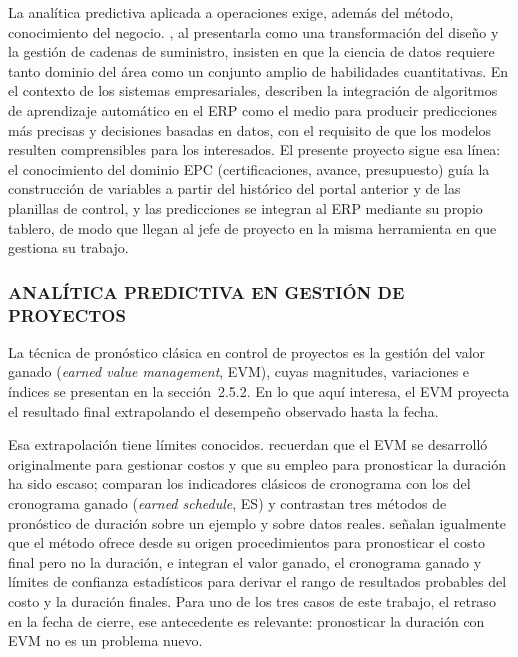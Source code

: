 La analítica predictiva aplicada a operaciones exige, además del método, conocimiento del negocio. \textcite{Waller2013}, al presentarla como una transformación del diseño y la gestión de cadenas de suministro, insisten en que la ciencia de datos requiere tanto dominio del área como un conjunto amplio de habilidades cuantitativas. En el contexto de los sistemas empresariales, \textcite{MLdrivenERP2023} describen la integración de algoritmos de aprendizaje automático en el ERP como el medio para producir predicciones más precisas y decisiones basadas en datos, con el requisito de que los modelos resulten comprensibles para los interesados. El presente proyecto sigue esa línea: el conocimiento del dominio EPC (certificaciones, avance, presupuesto) guía la construcción de variables a partir del histórico del portal anterior y de las planillas de control, y las predicciones se integran al ERP mediante su propio tablero, de modo que llegan al jefe de proyecto en la misma herramienta en que gestiona su trabajo.

\subsubsection{ANALÍTICA PREDICTIVA EN GESTIÓN DE PROYECTOS}

La técnica de pronóstico clásica en control de proyectos es la gestión del valor ganado (\textit{earned value management}, EVM), cuyas magnitudes, variaciones e índices se presentan en la sección~2.5.2. En lo que aquí interesa, el EVM proyecta el resultado final extrapolando el desempeño observado hasta la fecha.

Esa extrapolación tiene límites conocidos. \textcite{Vandevoorde2006} recuerdan que el EVM se desarrolló originalmente para gestionar costos y que su empleo para pronosticar la duración ha sido escaso; comparan los indicadores clásicos de cronograma con los del cronograma ganado (\textit{earned schedule}, ES) y contrastan tres métodos de pronóstico de duración sobre un ejemplo y sobre datos reales. \textcite{Lipke2009} señalan igualmente que el método ofrece desde su origen procedimientos para pronosticar el costo final pero no la duración, e integran el valor ganado, el cronograma ganado y límites de confianza estadísticos para derivar el rango de resultados probables del costo y la duración finales. Para uno de los tres casos de este trabajo, el retraso en la fecha de cierre, ese antecedente es relevante: pronosticar la duración con EVM no es un problema nuevo.

